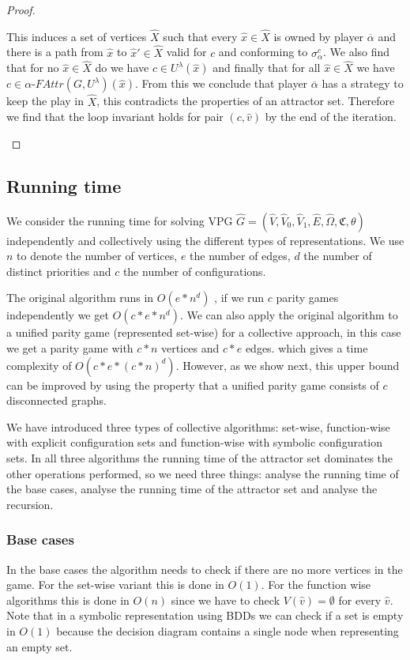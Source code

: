 \begin{theorem}
\begin{proof}
\begin{itemize}[\ \ ]
			This induces a set of vertices $\hat{X}$ such that every $\hat{x} \in \hat{X}$ is owned by player $\overline{\alpha}$ and there is a path from $\hat{x}$ to $\hat{x}'\in \hat{X}$ valid for $c$ and conforming to $\sigma_\alpha^c$. We also find that for no $\hat{x} \in \hat{X}$ do we have $c \in U^\lambda(\hat{x})$ and finally that for all $\hat{x} \in \hat{X}$ we have $c \in \alpha\textit{-FAttr}(G,U^\lambda)(\hat{x})$. From this we conclude that player $\overline{\alpha}$ has a strategy to keep the play in $\hat{X}$, this contradicts the properties of an attractor set. Therefore we find that the loop invariant holds for pair $(c,\hat{v})$ by the end of the iteration.
		\end{itemize}		
	\end{proof}
\end{theorem}

\subsection{Running time}
We consider the running time for solving VPG $\hat{G} = (\hat{V},\hat{V}_0,\hat{V}_1,\hat{E},\hat{\Omega},\mathfrak{C},\theta)$ independently and collectively using the different types of representations. We use $n$ to denote the number of vertices, $e$ the number of edges, $d$ the number of distinct priorities and $c$ the number of configurations.

The original algorithm runs in $O(e * n^d)$ \cite{friedmanPG}, if we run $c$ parity games independently we get $O(c * e * n ^d)$. We can also apply the original algorithm to a unified parity game (represented set-wise) for a collective approach, in this case we get a parity game with $c*n$ vertices and $c*e$ edges. which gives a time complexity of $O(c*e*(c*n)^d)$. However, as we show next, this upper bound can be improved by using the property that a unified parity game consists of $c$ disconnected graphs.

We have introduced three types of collective algorithms: set-wise, function-wise with explicit configuration sets and function-wise with symbolic configuration sets. In all three algorithms the running time of the attractor set dominates the other operations performed, so we need three things: analyse the running time of the base cases, analyse the running time of the attractor set and analyse the recursion.

\subsubsection{Base cases} In the base cases the algorithm needs to check if there are no more vertices in the game. For the set-wise variant this is done in $O(1)$. For the function wise algorithms this is done in $O(n)$ since we have to check $V(\hat{v}) = \emptyset$ for every $\hat{v}$. Note that in a symbolic representation using BDDs we can check if a set is empty in $O(1)$ because the decision diagram contains a single node when representing an empty set.

